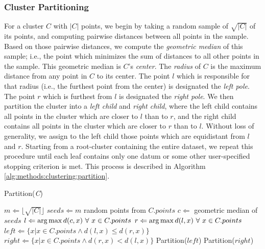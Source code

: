 \subsubsection {Cluster Partitioning}
\label{subsubsec:methods:cluster-partitioning}

For a cluster $C$ with $|C|$ points, we begin by taking a random sample of $\sqrt{|C|}$ of its points, and computing pairwise distances between all points in the sample.
Based on those pairwise distances, we compute the \emph{geometric median} of this sample; 
i.e., the point which minimizes the sum of distances to all other points in the sample.
This geometric median is $C$'s \emph{center}.
The \emph{radius} of $C$ is the maximum distance from any point in $C$ to its center.
The point $l$ which is responsible for that radius (i.e., the furthest point from the center) is designated the \emph{left pole}.
The point $r$ which is furthest from $l$ is designated the \emph{right pole}.
We then partition the cluster into a \emph{left child} and \emph{right child}, where the left child contains all points in the cluster which are closer to $l$ than to $r$, and the right child contains all points in the cluster which are closer to $r$ than to $l$.
Without loss of generality, we assign to the left child those points which are equidistant from $l$ and $r$.
Starting from a root-cluster containing the entire dataset, we repeat this procedure until each leaf contains only one datum or some other user-specified stopping criterion is met.
This process is described in Algorithm \ref{alg:methods:clustering:partition}.


\begin{algorithm} %
\caption{Partition(\emph{C})} %
\label{alg:methods:clustering:partition} %
\begin{algorithmic} %
    \STATE $m \Leftarrow \lfloor \sqrt{|C|} \rfloor$
    \STATE $seeds \Leftarrow m$ random points from $C.points$
    \STATE $c \Leftarrow$ geometric median of $seeds$
    \STATE $l \Leftarrow \operatorname*{arg\,max} d(c,x) \ \forall \ x \in C.points$
    \STATE $r \Leftarrow \operatorname*{arg\,max} d(l,x) \ \forall \ x \in C.points$
    \STATE $left \Leftarrow \{x | x \in C.points \land d(l,x) \le d(r,x)\}$
    \STATE $right \Leftarrow \{x | x \in C.points \land d(r,x) < d(l,x)\}$
        \STATE Partition($left$)
    \ENDIF
        \STATE Partition($right$)
    \ENDIF
\end{algorithmic}
\end{algorithm}


